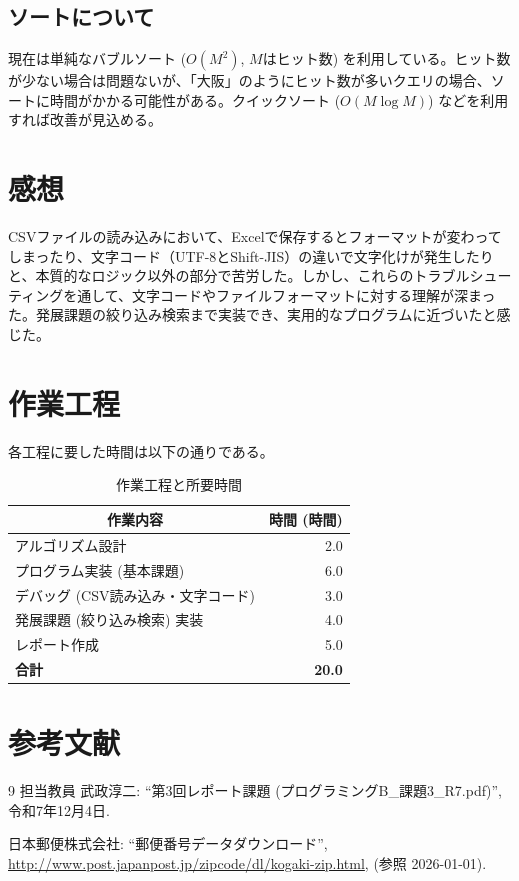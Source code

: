\documentclass[a4paper,dvipdfmx]{jsarticle}
\begin{document}
\subsection{ソートについて}
現在は単純なバブルソート ($O(M^2)$, $M$はヒット数) を利用している。ヒット数が少ない場合は問題ないが、「大阪」のようにヒット数が多いクエリの場合、ソートに時間がかかる可能性がある。クイックソート ($O(M \log M)$) などを利用すれば改善が見込める。

\section{感想}
CSVファイルの読み込みにおいて、Excelで保存するとフォーマットが変わってしまったり、文字コード（UTF-8とShift-JIS）の違いで文字化けが発生したりと、本質的なロジック以外の部分で苦労した。しかし、これらのトラブルシューティングを通して、文字コードやファイルフォーマットに対する理解が深まった。発展課題の絞り込み検索まで実装でき、実用的なプログラムに近づいたと感じた。


\section{作業工程}
各工程に要した時間は以下の通りである。

\begin{table}[H]
\centering
\caption{作業工程と所要時間}
\begin{tabular}{|l|r|}
\hline
\multicolumn{1}{|c|}{作業内容} & \multicolumn{1}{c|}{時間 (時間)} \\ \hline
アルゴリズム設計 & 2.0 \\ \hline
プログラム実装 (基本課題) & 6.0 \\ \hline
デバッグ (CSV読み込み・文字コード) & 3.0 \\ \hline
発展課題 (絞り込み検索) 実装 & 4.0 \\ \hline
レポート作成 & 5.0 \\ \hline
\textbf{合計} & \textbf{20.0} \\ \hline
\end{tabular}
\end{table}

\section{参考文献}
\begin{thebibliography}{9}
     担当教員 武政淳二: ``第3回レポート課題 (プログラミングB\_課題3\_R7.pdf)'', 令和7年12月4日.
    
     日本郵便株式会社: ``郵便番号データダウンロード'', \url{http://www.post.japanpost.jp/zipcode/dl/kogaki-zip.html}, (参照 2026-01-01).
\end{thebibliography}
\end{document}

